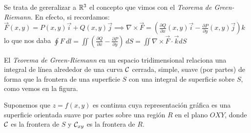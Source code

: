 \documentclass{report}
\begin{document}
    \noindent Se trata de gereralizar a $\mathbb{R}^3$ el concepto que vimos con el \textit{Teorema de Green-Riemann}. En efecto, si recordamos:\\
    $\vec{F}(x,y)=P(x,y)\vec{i}+Q(x,y)\vec{j}\implies\nabla\times\vec{F}=\left(\frac{\partial Q}{\partial x}(x,y)\vec{i}-\frac{\partial P}{\partial y}(x,y)\vec{j}\right)k$\\
    lo que nos daba $\oint F\ dl=\iint\left(\frac{\partial Q}{\partial x}-\frac{\partial P}{\partial y}\right)\ dS=\iint \nabla\times\vec{F}\cdot\vec{k}dS$\\

    \begin{figure}
      \vspace{-0.6cm}
    \end{figure}

    \noindent El \textit{Teorema de Green-Riemann} en un espacio tridimensional relaciona una integral de línea alrededor de una curva $\mathcal{C}$ cerrada, simple, suave (por partes)
    de forma que la frontera de una superficie $S$ con una integral de superficie sobre $S$, como vemos en la figura.
      
    \vspace{0.34cm}\noindent Suponemos que $z=f(x,y)$ es continua cuya representación gráfica es una superficie orientada suave por partes sobre una región $R$ en el plano $OXY$, donde $\mathcal{C}$ es la frontera de $S$ y $\mathcal{C}_{xy}$ es la frontera de $R$.
\end{document}
